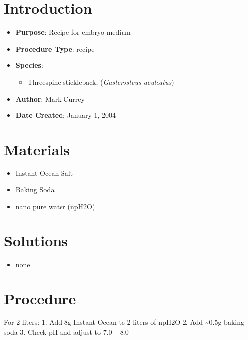 \documentclass[
  letterpaper,
  DIV=11,
  numbers=noendperiod]{scrreprt}
\providecommand{\tightlist}{%
  \setlength{\itemsep}{0pt}\setlength{\parskip}{0pt}}\usepackage{longtable,booktabs,array}
\begin{document}
\hypertarget{introduction-66}{%
\section{Introduction}\label{introduction-66}}

\begin{itemize}
\tightlist
\item
  \textbf{Purpose}: Recipe for embryo medium\\
\item
  \textbf{Procedure Type}: recipe
\item
  \textbf{Species}:

  \begin{itemize}
  \tightlist
  \item
    Threespine stickleback, (\emph{Gasterosteus aculeatus})
  \end{itemize}
\item
  \textbf{Author}: Mark Currey
\item
  \textbf{Date Created}: January 1, 2004
\end{itemize}

\hypertarget{materials-61}{%
\section{Materials}\label{materials-61}}

\begin{itemize}
\tightlist
\item
  Instant Ocean Salt
\item
  Baking Soda
\item
  nano pure water (npH2O)
\end{itemize}

\hypertarget{solutions-57}{%
\section{Solutions}\label{solutions-57}}

\begin{itemize}
\tightlist
\item
  none
\end{itemize}

\hypertarget{procedure-62}{%
\section{Procedure}\label{procedure-62}}

For 2 liters: 1. Add 8g Instant Ocean to 2 liters of npH2O 2. Add
\textasciitilde0.5g baking soda 3. Check pH and adjust to 7.0 -- 8.0
\end{document}
